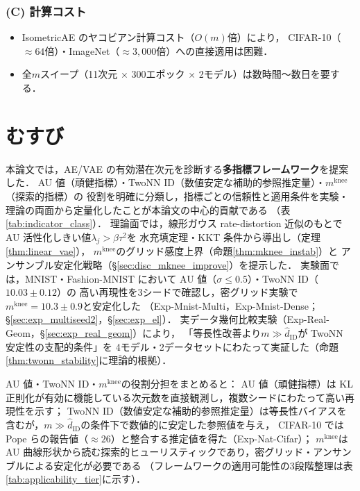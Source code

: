 \documentclass[11pt,a4paper]{jsarticle}
\newcommand{\mknee}{m^{\mathrm{knee}}}
\begin{document}
\subsubsection*{(C) 計算コスト}

\begin{itemize}
  \item IsometricAE のヤコビアン計算コスト（$O(m)$倍）により，
        CIFAR-10（$\approx 64$倍）・ImageNet（$\approx 3{,}000$倍）への直接適用は困難．
  \item 全$m$スイープ（11次元 $\times$ 300エポック $\times$ 2モデル）は数時間〜数日を要する．
\end{itemize}

\section{むすび}\label{sec:conclusion}

本論文では，AE/VAE の有効潜在次元を診断する\textbf{多指標フレームワーク}を提案した．
AU 値（頑健指標）・TwoNN ID（数値安定な補助的参照推定量）・$\mknee$（探索的指標）の
役割を明確に分類し，指標ごとの信頼性と適用条件を実験・理論の両面から定量化したことが本論文の中心的貢献である
（表\ref{tab:indicator_class}）．
理論面では，線形ガウス rate-distortion 近似のもとで AU 活性化しきい値$\lambda_j > \beta\tau^2$を
水充填定理・KKT 条件から導出し（定理\ref{thm:linear_vae}），
$\mknee$のグリッド感度上界（命題\ref{thm:mknee_instab}）と
アンサンブル安定化戦略（§\ref{sec:disc_mknee_improve}）を提示した．
実験面では，MNIST・Fashion-MNIST において AU 値（$\sigma \leq 0.5$）・TwoNN ID（$10.03 \pm 0.12$）の
高い再現性を3シードで確認し，密グリッド実験で$\mknee = 10.3 \pm 0.9$と安定化した
（Exp-Mnist-Multi，Exp-Mnist-Dense；§\ref{sec:exp_multiseed2}，§\ref{sec:exp_el}）．
実データ幾何比較実験（Exp-Real-Geom，§\ref{sec:exp_real_geom}）により，
「等長性改善より$m \gg \hat{d}_\mathrm{ID}$が TwoNN 安定性の支配的条件」を
4モデル・2データセットにわたって実証した（命題\ref{thm:twonn_stability}に理論的根拠）．

AU 値・TwoNN ID・$\mknee$の役割分担をまとめると：
AU 値（頑健指標）は KL 正則化が有効に機能している次元数を直接観測し，複数シードにわたって高い再現性を示す；
TwoNN ID（数値安定な補助的参照推定量）は等長性バイアスを含むが，$m \gg \hat{d}_\mathrm{ID}$の条件下で数値的に安定した参照値を与え，
CIFAR-10 では Pope ら\cite{pope2021intrinsic}の報告値（$\approx 26$）と整合する推定値を得た（Exp-Nat-Cifar）；
$\mknee$は AU 曲線形状から読む探索的ヒューリスティックであり，密グリッド・アンサンブルによる安定化が必要である
（フレームワークの適用可能性の3段階整理は表\ref{tab:applicability_tier}に示す）．
\end{document}
